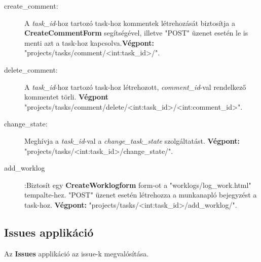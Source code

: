 \begin{itemize}
\begin{description}
		\item[create\_comment:] A \textit{task\_id}-hoz tartozó task-hoz kommentek létrehozását biztosítja a \textbf{CreateCommentForm} segítségével, illetve "POST" üzenet esetén le is menti azt a task-hoz kapcsolva.\textbf{Végpont:} "projects/tasks/comment/<int:task\_id>/".
		\item[delete\_comment:] A \textit{task\_id}-hoz tartozó task-hoz létrehozott, \textit{comment\_id}-val rendelkező kommentet törli. \textbf{Végpont} "projects/tasks/comment/delete/<int:task\_id>/<int:comment\_id>".
		\item[change\_state:] Meghívja a \textit{task\_id}-val a \textit{change\_task\_state} szolgáltatást. \textbf{Végpont:} "projects/tasks/<int:task\_id>/change\_state/".
		\item[add\_worklog]:Biztosít egy \textbf{CreateWorklogform} form-ot a "worklogs/log\_work.html" tempalte-hez. "POST" üzenet esetén létrehozza a munkanapló bejegyzést a task-hoz. \textbf{Végpont:} "projects/tasks/<int:task\_id>/add\_worklog/".
	\end{description}
\end{itemize}	

\subsection{Issues applikáció}

Az \textbf{Issues} applikáció az issue-k megvalósítása. 

